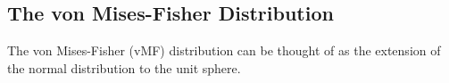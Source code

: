 \subsection{The von Mises-Fisher Distribution}

The von Mises-Fisher (vMF) distribution can be thought of as the extension of the normal distribution to the unit sphere.

